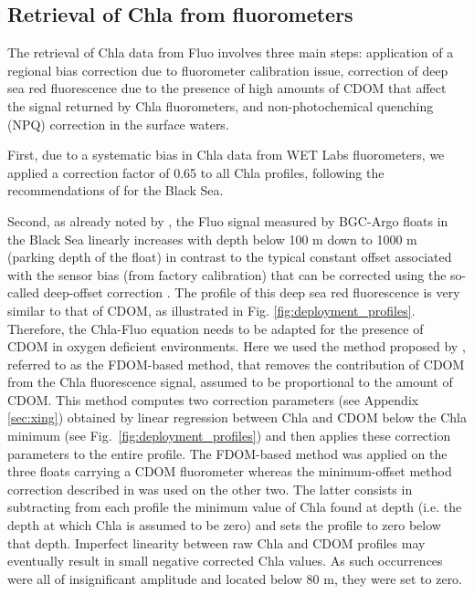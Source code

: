 \documentclass[journal abbreviation, manuscript]{copernicus}
\begin{document}
\subsection{Retrieval of Chla from fluorometers}

The retrieval of Chla data from Fluo involves three main steps: application of a regional bias correction due to fluorometer calibration issue, correction of deep sea red fluorescence due to the presence of high amounts of CDOM that affect the signal returned by Chla fluorometers, and non-photochemical quenching (NPQ) correction in the surface waters.

First, due to a systematic bias in Chla data from WET Labs fluorometers, we applied a correction factor of 0.65 to all Chla profiles, following the recommendations of \citet{Roesler2017} for the Black Sea.

Second, as already noted by \citet{Xing2017}, the Fluo signal measured by BGC-Argo floats in the Black Sea linearly increases with depth below 100 \unit{m} down to 1000 \unit{m} (parking depth of the float) in contrast to the typical constant offset associated with the sensor bias (from factory calibration) that can be corrected using the so-called deep-offset correction \citep{Schmechtig2018}.
The profile of this deep sea red fluorescence is very similar to that of CDOM, as illustrated in Fig. \ref{fig:deployment_profiles}. Therefore, the Chla-Fluo equation needs to be adapted for the presence of CDOM in oxygen deficient environments.
Here we used the method proposed by \citet{Xing2017}, referred to as the FDOM-based method, that removes the contribution of CDOM from the Chla fluorescence signal, assumed to be proportional to the amount of CDOM. This method computes two correction parameters (see Appendix \ref{sec:xing}) obtained by linear regression between Chla and CDOM below the Chla minimum (see Fig.~\ref{fig:deployment_profiles}) and then applies these correction parameters to the entire profile.
The FDOM-based method was applied on the three floats carrying a CDOM fluorometer whereas the minimum-offset method correction described in \citet{Xing2017} was used on the other two.
The latter consists in subtracting from each profile the minimum value of Chla found at depth (i.e. the depth at which Chla is assumed to be zero) and sets the profile to zero below that depth. Imperfect linearity between raw Chla and CDOM profiles may eventually result in small negative corrected Chla values. As such occurrences were all of insignificant amplitude and located below 80 \unit{m}, they were set to zero.
\end{document}
